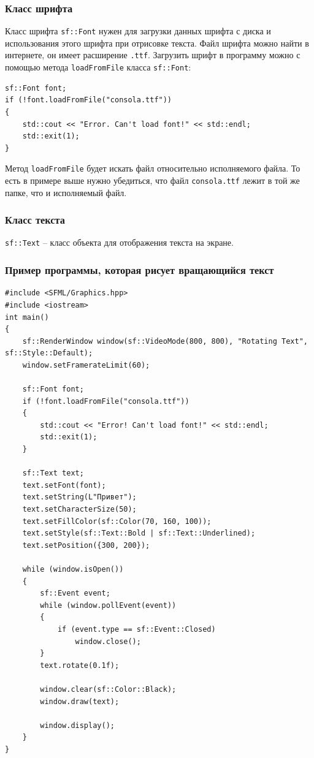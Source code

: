 \documentclass{article}
\begin{document}
\subsubsection*{Класс шрифта}
Класс шрифта \texttt{sf::Font} нужен для загрузки данных шрифта с диска и использования этого шрифта при отрисовке текста. Файл шрифта можно найти в интернете, он имеет расширение \texttt{.ttf}. Загрузить шрифт в программу можно с помощью метода \texttt{loadFromFile} класса \texttt{sf::Font}:
\begin{lstlisting}
sf::Font font;
if (!font.loadFromFile("consola.ttf")) 
{
    std::cout << "Error. Can't load font!" << std::endl;
    std::exit(1);
}
\end{lstlisting}
Метод \texttt{loadFromFile} будет искать файл относительно исполняемого файла. То есть в примере выше нужно убедиться, что файл \texttt{consola.ttf} лежит в той же папке, что и исполняемый файл.

\subsubsection*{Класс текста}
\texttt{sf::Text} -- класс объекта для отображения текста на экране.


\subsubsection*{Пример программы, которая рисует вращающийся текст}
\begin{lstlisting}
#include <SFML/Graphics.hpp>
#include <iostream>
int main()
{
    sf::RenderWindow window(sf::VideoMode(800, 800), "Rotating Text", sf::Style::Default);
    window.setFramerateLimit(60);
    
    sf::Font font;
    if (!font.loadFromFile("consola.ttf")) 
    {
        std::cout << "Error! Can't load font!" << std::endl;
        std::exit(1);
    }

    sf::Text text;
    text.setFont(font);
    text.setString(L"Привет");
    text.setCharacterSize(50);
    text.setFillColor(sf::Color(70, 160, 100));
    text.setStyle(sf::Text::Bold | sf::Text::Underlined);
    text.setPosition({300, 200});

    while (window.isOpen())
    {
        sf::Event event;
        while (window.pollEvent(event)) 
        {
            if (event.type == sf::Event::Closed)
                window.close();
        }
        text.rotate(0.1f);

        window.clear(sf::Color::Black);
        window.draw(text);

        window.display();
    }
}
\end{lstlisting}
\end{document}
